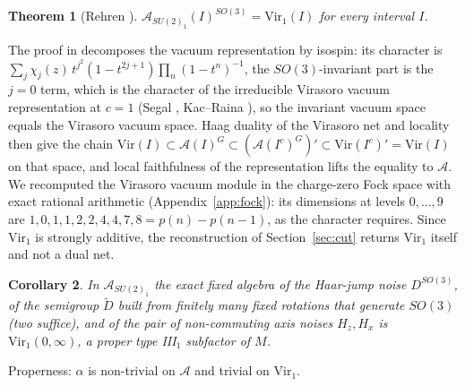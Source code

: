 \documentclass[12pt]{article}
\newtheorem{theorem}{Theorem}[section]
\newtheorem{corollary}[theorem]{Corollary}
\theoremstyle{definition}
\theoremstyle{remark}
\begin{document}
\begin{theorem}[Rehren {\cite{Rehren}}]\label{thm:Rehren}
\(\mathcal A_{SU(2)_1}(I)^{SO(3)}=\mathrm{Vir}_1(I)\) for every interval \(I\).
\end{theorem}
The proof in \cite{Rehren} decomposes the vacuum representation by isospin: its
character is \(\sum_j\chi_j(z)\,t^{j^2}(1-t^{2j+1})\prod_n(1-t^n)^{-1}\), the
\(SO(3)\)-invariant part is the \(j=0\) term, which is the character of the
irreducible Virasoro vacuum representation at \(c=1\) (Segal \cite{Segal}, Kac--Raina \cite{KR}), so the
invariant vacuum space equals the Virasoro vacuum space. Haag duality of the Virasoro net \cite{BSM} and locality then give the chain
\(\mathrm{Vir}(I)\subset\mathcal A(I)^G\subset(\mathcal A(I^c)^G)'\subset\mathrm{Vir}(I^c)'=\mathrm{Vir}(I)\)
on that space, and local faithfulness of the representation lifts the equality to
\(\mathcal A\). We recomputed the Virasoro vacuum module in the charge-zero Fock space
with exact rational arithmetic (Appendix~\ref{app:fock}): its dimensions at levels \(0,\dots,9\)
are \(1,0,1,1,2,2,4,4,7,8=p(n)-p(n-1)\), as the character requires. Since
\(\mathrm{Vir}_1\) is strongly additive, the reconstruction of Section~\ref{sec:cut}
returns \(\mathrm{Vir}_1\) itself and not a dual net.

\begin{corollary}\label{cor:selected}
In \(\mathcal A_{SU(2)_1}\) the exact fixed algebra of the Haar-jump noise
\(D^{SO(3)}\), of the semigroup \(\tilde D\) built from finitely many fixed rotations that generate \(SO(3)\) (two suffice), and of the pair of
non-commuting axis noises \(H_z,H_x\) is \(\mathrm{Vir}_1(0,\infty)\), a proper
type III\(_1\) subfactor of \(M\).
\end{corollary}
Properness: \(\alpha\) is non-trivial on \(\mathcal A\) and trivial on \(\mathrm{Vir}_1\).
\end{document}
